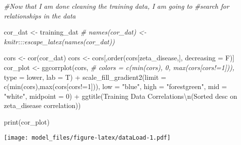 \documentclass[
]{article}
\newenvironment{Shaded}{\begin{snugshade}}{\end{snugshade}}
\newcommand{\AttributeTok}[1]{\textcolor[rgb]{0.77,0.63,0.00}{#1}}
\newcommand{\CommentTok}[1]{\textcolor[rgb]{0.56,0.35,0.01}{\textit{#1}}}
\newcommand{\DecValTok}[1]{\textcolor[rgb]{0.00,0.00,0.81}{#1}}
\newcommand{\FunctionTok}[1]{\textcolor[rgb]{0.00,0.00,0.00}{#1}}
\newcommand{\NormalTok}[1]{#1}
\newcommand{\OtherTok}[1]{\textcolor[rgb]{0.56,0.35,0.01}{#1}}
\newcommand{\SpecialCharTok}[1]{\textcolor[rgb]{0.00,0.00,0.00}{#1}}
\newcommand{\StringTok}[1]{\textcolor[rgb]{0.31,0.60,0.02}{#1}}
\begin{document}
\begin{Shaded}
\begin{Highlighting}[]
\CommentTok{\#Now that I am done cleaning the training data, I am going to }
\CommentTok{\#search for relationships in the data}

\NormalTok{cor\_dat }\OtherTok{\textless{}{-}}\NormalTok{ training\_dat}
\CommentTok{\# names(cor\_dat) \textless{}{-} knitr:::escape\_latex(names(cor\_dat))}

\NormalTok{cors }\OtherTok{\textless{}{-}} \FunctionTok{cor}\NormalTok{(cor\_dat)}
\NormalTok{cors }\OtherTok{\textless{}{-}}\NormalTok{ cors[,}\FunctionTok{order}\NormalTok{(cors[}\StringTok{\textquotesingle{}zeta\_disease\textquotesingle{}}\NormalTok{,], }\AttributeTok{decreasing =}\NormalTok{ F)]}
\NormalTok{cor\_plot }\OtherTok{\textless{}{-}} \FunctionTok{ggcorrplot}\NormalTok{(cors,}
                       \CommentTok{\# colors = c(min(cors), 0, max(cors[cors!=1])),}
                       \AttributeTok{type =} \StringTok{\textquotesingle{}lower\textquotesingle{}}\NormalTok{,}
                       \AttributeTok{lab =}\NormalTok{ T) }\SpecialCharTok{+}
  \FunctionTok{scale\_fill\_gradient2}\NormalTok{(}\AttributeTok{limit =} \FunctionTok{c}\NormalTok{(}\FunctionTok{min}\NormalTok{(cors),}\FunctionTok{max}\NormalTok{(cors[cors}\SpecialCharTok{!=}\DecValTok{1}\NormalTok{])), }\AttributeTok{low =} \StringTok{"blue"}\NormalTok{, }\AttributeTok{high =}  \StringTok{"forestgreen"}\NormalTok{, }\AttributeTok{mid =} \StringTok{"white"}\NormalTok{, }\AttributeTok{midpoint =} \DecValTok{0}\NormalTok{) }\SpecialCharTok{+}
  \FunctionTok{ggtitle}\NormalTok{(}\StringTok{\textquotesingle{}Training Data Correlations}\SpecialCharTok{\textbackslash{}n}\StringTok{(Sorted desc on zeta\_disease correlation)\textquotesingle{}}\NormalTok{)}

\FunctionTok{print}\NormalTok{(cor\_plot)}
\end{Highlighting}
\end{Shaded}

\texttt{[image: model\_files/figure-latex/dataLoad-1.pdf]}
\end{document}
